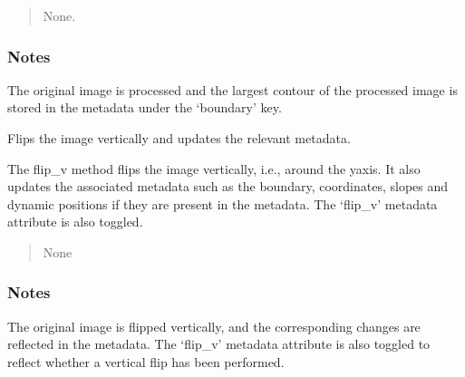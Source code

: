 \documentclass[letterpaper,10pt,english]{sphinxmanual}
\begin{document}
\begin{fulllineitems}
\begin{fulllineitems}
\begin{quote}
\begin{description}
\begin{itemize}
\end{itemize}

\sphinxAtStartPar
None.

\end{description}\end{quote}
\subsubsection*{Notes}

\sphinxAtStartPar
The original image is processed and the largest contour of the processed image is stored in the metadata under the ‘boundary’ key.

\end{fulllineitems}


\begin{fulllineitems}
\label{\detokenize{forensicfit.core.tape:forensicfit.core.tape.TapeAnalyzer.flip_v}}
\pysigstartsignatures
{}
\pysigstopsignatures
\sphinxAtStartPar
Flips the image vertically and updates the relevant metadata.

\sphinxAtStartPar
The flip\_v method flips the image vertically, i.e., around the y\sphinxhyphen{}axis. It also updates the associated
metadata such as the boundary, coordinates, slopes and dynamic positions if they are present in the metadata.
The ‘flip\_v’ metadata attribute is also toggled.
\begin{quote}\begin{description}
\sphinxAtStartPar
{} \textendash{} 

\sphinxAtStartPar
None

\end{description}\end{quote}
\subsubsection*{Notes}

\sphinxAtStartPar
The original image is flipped vertically, and the corresponding changes are reflected in the metadata. The ‘flip\_v’
metadata attribute is also toggled to reflect whether a vertical flip has been performed.


\end{fulllineitems}
\end{fulllineitems}
\end{document}
